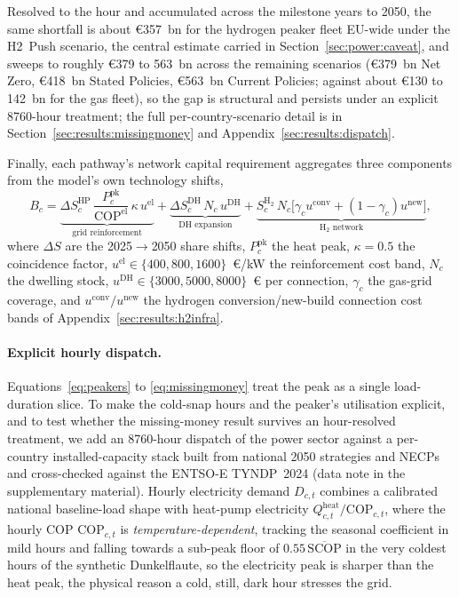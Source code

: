 Resolved to the hour and accumulated across the milestone years to 2050, the same
shortfall is about \euro{}357~bn for the hydrogen peaker fleet EU-wide under the H2~Push
scenario, the central estimate carried in Section~\ref{sec:power:caveat}, and sweeps to
roughly \euro{}379 to 563~bn across the remaining scenarios (\euro{}379~bn Net Zero,
\euro{}418~bn Stated Policies, \euro{}563~bn Current Policies; against about \euro{}130
to 142~bn for the gas fleet), so the gap is structural and persists under an explicit
8760-hour treatment; the full per-country-scenario detail is in
Section~\ref{sec:results:missingmoney} and Appendix~\ref{sec:results:dispatch}.

Finally, each pathway's network capital requirement aggregates three components
from the model's own technology shifts,
%
\begin{equation}
\label{eq:infrabill}
    B_{c} = \underbrace{\Delta S^{\mathrm{HP}}_{c}\,
            \frac{P^{\mathrm{pk}}_{c}}{\mathrm{COP}^{\mathrm{el}}}\,
            \kappa\, u^{\mathrm{el}}}_{\text{grid reinforcement}}
          + \underbrace{\Delta S^{\mathrm{DH}}_{c}\, N_{c}\,
            u^{\mathrm{DH}}}_{\text{DH expansion}}
          + \underbrace{S^{\mathrm{H_2}}_{c}\, N_{c}
            \bigl[\gamma_{c} u^{\mathrm{conv}} + (1-\gamma_{c})
            u^{\mathrm{new}}\bigr]}_{\text{H}_2\text{ network}},
\end{equation}
%
where $\Delta S$ are the 2025$\to$2050 share shifts, $P^{\mathrm{pk}}_{c}$ the heat
peak, $\kappa{=}0.5$ the coincidence factor,
$u^{\mathrm{el}}\in\{400,800,1600\}$~\euro{}/kW the reinforcement cost band, $N_{c}$
the dwelling stock, $u^{\mathrm{DH}}\in\{3000,5000,8000\}$~\euro{} per connection,
$\gamma_{c}$ the gas-grid coverage, and $u^{\mathrm{conv}}/u^{\mathrm{new}}$ the
hydrogen conversion/new-build connection cost bands of
Appendix~\ref{sec:results:h2infra}.

\paragraph{Explicit hourly dispatch.} Equations~\eqref{eq:peakers} to
\eqref{eq:missingmoney} treat the peak as a single load-duration slice. To make the
cold-snap hours and the peaker's utilisation explicit, and to test whether the
missing-money result survives an hour-resolved treatment, we add an 8760-hour dispatch
of the power sector against a per-country installed-capacity stack built from national
2050 strategies and NECPs and cross-checked against the ENTSO-E TYNDP~2024 (data note in
the supplementary material). Hourly electricity demand $D_{c,t}$ combines a calibrated
national baseline-load shape with heat-pump electricity
$Q^{\mathrm{heat}}_{c,t}/\mathrm{COP}_{c,t}$, where the hourly COP $\mathrm{COP}_{c,t}$
is \emph{temperature-dependent}, tracking the seasonal coefficient in mild hours and
falling towards a sub-peak floor of $0.55\,\overline{\mathrm{SCOP}}$ in the very coldest hours
of the synthetic Dunkelflaute, so the electricity peak is sharper than the heat peak,
the physical reason a cold, still, dark hour stresses the grid.

